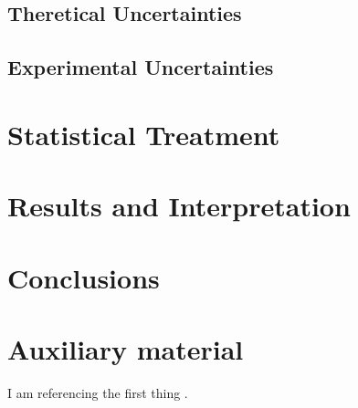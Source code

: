 \documentclass{outhesis}
\begin{document}
\section{Theretical Uncertainties}\label{sec:syst.theory}

\section{Experimental Uncertainties}\label{sec:syst.exp}


\chapter{Statistical Treatment}\label{chap:stat}
\graphicspath{{figures/stat/}}


\chapter{Results and Interpretation}\label{chap:res}
\graphicspath{{figures/res/}}


\chapter{Conclusions}\label{chap:concl}
\graphicspath{{figures/concl/}}


\clearpage

\appendix

\chapter{Auxiliary material}\label{chap:aux}
\graphicspath{{figures/aux/}}

I am referencing the first thing \cite{PERF-2007-01}.

%


\backmatter
\end{document}
